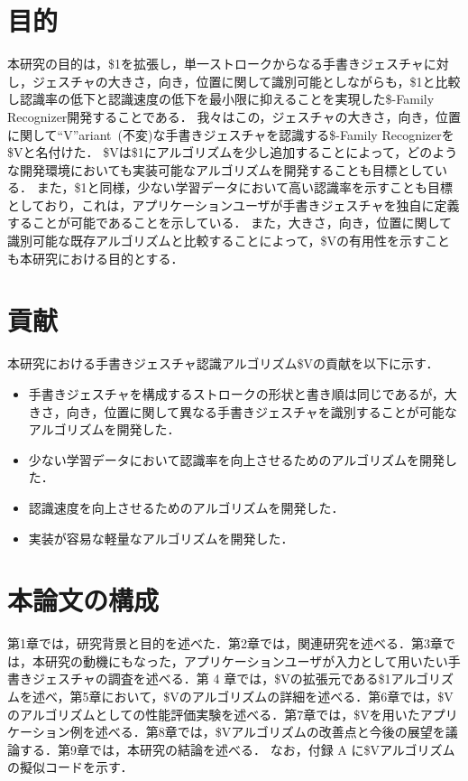 \section{目的}
本研究の目的は，\$1を拡張し，単一ストロークからなる手書きジェスチャに対し，ジェスチャの大きさ，向き，位置に関して識別可能としながらも，\$1と比較し認識率の低下と認識速度の低下を最小限に抑えることを実現した\$-Family Recognizer開発することである．
我々はこの，ジェスチャの大きさ，向き，位置に関して``V''ariant~(不変)な手書きジェスチャを認識する\$-Family Recognizerを\$Vと名付けた．
\$Vは\$1にアルゴリズムを少し追加することによって，どのような開発環境においても実装可能なアルゴリズムを開発することも目標としている．
また，\$1と同様，少ない学習データにおいて高い認識率を示すことも目標としており，これは，アプリケーションユーザが手書きジェスチャを独自に定義することが可能であることを示している．
また，大きさ，向き，位置に関して識別可能な既存アルゴリズムと比較することによって，\$Vの有用性を示すことも本研究における目的とする．



\section{貢献}
本研究における手書きジェスチャ認識アルゴリズム\$Vの貢献を以下に示す．
\begin{itemize}
\item 手書きジェスチャを構成するストロークの形状と書き順は同じであるが，大きさ，向き，位置に関して異なる手書きジェスチャを識別することが可能なアルゴリズムを開発した．
\item 少ない学習データにおいて認識率を向上させるためのアルゴリズムを開発した．
\item 認識速度を向上させるためのアルゴリズムを開発した．
\item 実装が容易な軽量なアルゴリズムを開発した．
\end{itemize}

\section{本論文の構成}
第1章では，研究背景と目的を述べた．第2章では，関連研究を述べる．第3章では，本研究の動機にもなった，アプリケーションユーザが入力として用いたい手書きジェスチャの調査を述べる．第 4 章では，\$Vの拡張元である\$1アルゴリズムを述べ，第5章において，\$Vのアルゴリズムの詳細を述べる．第6章では，\$Vのアルゴリズムとしての性能評価実験を述べる．第7章では，\$Vを用いたアプリケーション例を述べる．第8章では，\$Vアルゴリズムの改善点と今後の展望を議論する．第9章では，本研究の結論を述べる．
なお，付録 A に\$Vアルゴリズムの擬似コードを示す．
